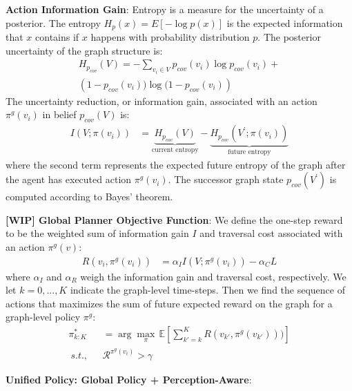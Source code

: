 \documentclass[letterpaper, 10pt, conference]{ieeeconf}      %
\newcommand{\ph}[1]{{\textbf{#1}:}} %
\begin{document}
{\ph{Action Information Gain} Entropy is a measure for the uncertainty of a posterior. The entropy $H_p(x) = E[-\log p(x)]$ is the expected information that $x$ contains if $x$ happens with probability distribution $p$. The posterior uncertainty of the graph structure is:
\begin{align}
    H_{p_{cov}}(V) = -\sum_{v_i \in V}p_{cov}(v_i) \log p_{cov}(v_i) + \\ \left(1-p_{cov}(v_i)) \log (1-p_{cov}(v_i)\right)
\end{align}
The uncertainty reduction, or information gain, associated with an action $\pi^g(v_i)$ in belief $p_{cov}(V)$ is:
\begin{align}
    I(V; \pi(v_i)) &= \underbrace{H_{p_{cov}}(V)}_\text{current entropy} - \underbrace{H_{p_{cov}}(V^\prime; \pi(v_i))}_\text{future entropy}
\end{align}
where the second term represents the expected future entropy of the graph after the agent has executed action $\pi^g(v_i)$. The successor graph state $p_{cov}(V^\prime)$ is computed according to Bayes' theorem. 


\ph{[WIP] Global Planner Objective Function} We define the one-step reward to be the weighted sum of information gain $I$ and traversal cost associated with an action $\pi^g(v)$:
\begin{align}
    R(v_i, \pi^g(v_i)) &= \alpha_I I(V; \pi^g(v_i)) - \alpha_C L 
\end{align}
where $\alpha_I$ and $\alpha_R$ weigh the information gain and traversal cost, respectively. We let $k=0,...,K$ indicate the graph-level time-steps. Then we find the sequence of actions that maximizes the sum of future expected reward on the graph for a graph-level policy $\pi^g$:
\begin{align}
    \pi^*_{k:K} &= \arg\max_\pi \, \mathbb{E} \left[ \sum_{k'=k}^{K} R(v_{k'}, \pi^g(v_{k'}))) \right] \\
    ~s.t.,~~~ & \mathcal{R}^{\pi^g(v_i)} > \gamma \nonumber 
\end{align}

\ph{Unified Policy: Global Policy + Perception-Aware}

}
\end{document}
